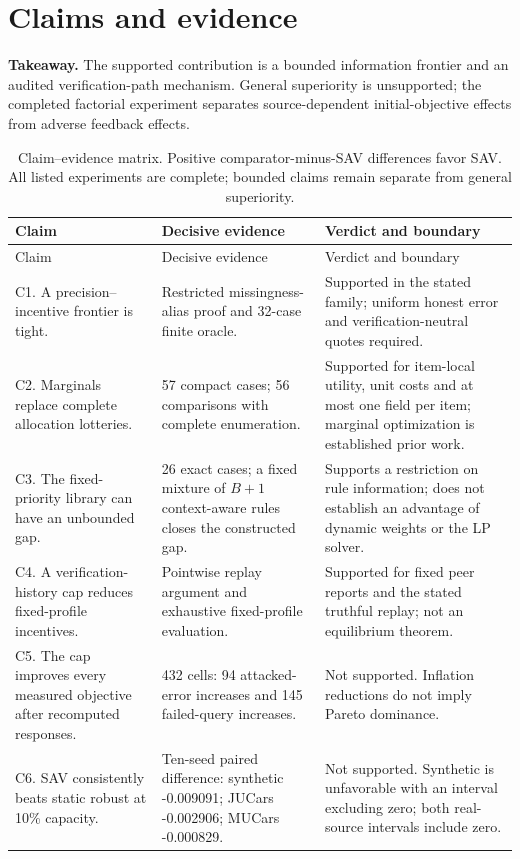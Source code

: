 \documentclass[11pt]{article}
\begin{document}
\section{Claims and evidence}
\noindent\textbf{Takeaway.} The supported contribution is a bounded information
frontier and an audited verification-path mechanism. General superiority is unsupported; the completed factorial experiment
separates source-dependent initial-objective effects from adverse feedback effects.

\small
\begin{longtable}{p{}p{}p{}}
\caption{Claim--evidence matrix. Positive comparator-minus-SAV differences
favor SAV. All listed experiments are complete; bounded claims remain separate from general superiority.}\\
\toprule
Claim & Decisive evidence & Verdict and boundary\\
\midrule
\endfirsthead
\toprule Claim & Decisive evidence & Verdict and boundary\\\midrule
\endhead
C1. A precision--incentive frontier is tight. & Restricted missingness-alias proof and 32-case finite oracle. & Supported in the stated family; uniform honest error and verification-neutral quotes required.\\
\addlinespace
C2. Marginals replace complete allocation lotteries. & 57 compact cases; 56 comparisons with complete enumeration. & Supported for item-local utility, unit costs and at most one field per item; marginal optimization is established prior work.\\
\addlinespace
C3. The fixed-priority library can have an unbounded gap. & 26 exact cases; a fixed mixture of $B+1$ context-aware rules closes the constructed gap. & Supports a restriction on rule information; does not establish an advantage of dynamic weights or the LP solver.\\
\addlinespace
C4. A verification-history cap reduces fixed-profile incentives. & Pointwise replay argument and exhaustive fixed-profile evaluation. & Supported for fixed peer reports and the stated truthful replay; not an equilibrium theorem.\\
\addlinespace
C5. The cap improves every measured objective after recomputed responses. & 432 cells: 94 attacked-error increases and 145 failed-query increases. & Not supported. Inflation reductions do not imply Pareto dominance.\\
\addlinespace
C6. SAV consistently beats static robust at 10\% capacity. & Ten-seed paired difference: synthetic -0.009091; JUCars -0.002906; MUCars -0.000829. & Not supported. Synthetic is unfavorable with an interval excluding zero; both real-source intervals include zero.\\

\end{longtable}
\end{document}
